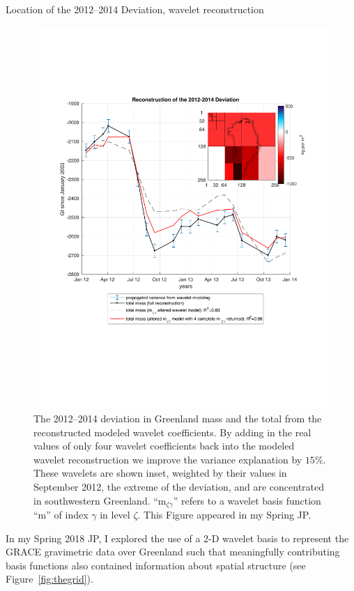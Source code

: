 \documentclass[11pt]{report}
\begin{document}
Location of the 2012--2014 Deviation, wavelet reconstruction
\begin{figure} 
\vspace{-50pt}
\includegraphics[width=\linewidth]{Figures/deviant.pdf}
\caption[Location of the 2012--2014 Deviation]{The 2012--2014 deviation in Greenland mass and the total from the reconstructed modeled wavelet coefficients. By adding in the real values of only four wavelet coefficients back into the modeled wavelet reconstruction we improve the variance explanation by $15\%$. These wavelets are shown inset, weighted by their values in September 2012, the extreme of the deviation, and are concentrated in southwestern Greenland. ``m$_{\zeta\gamma}$'' refers to a wavelet basis function ``m'' of index $\gamma$ in level $\zeta$. This Figure appeared in my Spring JP.
\label{fig:deviant}}
\end{figure}

In my Spring 2018 JP, I explored the use of a 2-D wavelet basis to represent the GRACE gravimetric data over Greenland such that meaningfully contributing basis functions also contained information about spatial structure (see
Figure~\ref{fig:thegrid}). 
\end{document}
